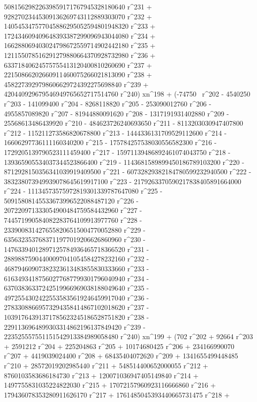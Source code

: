        50815629822639859171767945328180640 r^231 + 
       92827023445309136269743112889303070 r^232 + 
       140545347577045886295052594801948320 r^233 + 
       172434609409648393387299096943044080 r^234 + 
       166288069403024798672559714902442180 r^235 + 
       121155078516291279880664370928732980 r^236 + 
       63371840624575755413120400810260690 r^237 + 
       22150866202660911460075266021813090 r^238 + 
       4582273929798606629724392275698840 r^239 + 
       420440929679546949765652717514760 r^240) xn^198 + (-74750 \
r^202 - 4540250 r^203 - 141099400 r^204 - 8268118820 r^205 - 
       253090012760 r^206 - 4955857089820 r^207 - 
       81944880091620 r^208 - 1317191931402880 r^209 - 
       25568613486439920 r^210 - 484623726240693650 r^211 - 
       8113203030947407800 r^212 - 115211273586820678800 r^213 - 
       1444336131709529112600 r^214 - 16606297736111160340200 r^215 - 
       175784257538030556582300 r^216 - 
       1729205139790523111459400 r^217 - 
       15971139486892461074043750 r^218 - 
       139365905534037344523866400 r^219 - 
       1143681589899450186789103200 r^220 - 
       8712928150356341039919409500 r^221 - 
       60732829382184780599232940500 r^222 - 
       383238073949939078645619917100 r^223 - 
       2179263370590217838405891664000 r^224 - 
       11134573575972819301339787647080 r^225 - 
       50915808145533673996522088487120 r^226 - 
       207220971333054900484759584432960 r^227 - 
       744571990584082283764109913977760 r^228 - 
       2339008314276558206515004770052880 r^229 - 
       6356323537683711977019206626860960 r^230 - 
       14763394012897125784936465718366520 r^231 - 
       28898875904400097041054584278232160 r^232 - 
       46879460907382323613483855830333660 r^233 - 
       61634934187560277687799301796040940 r^234 - 
       63703836337242519966969038188049640 r^235 - 
       49725543024225535835619246459917040 r^236 - 
       27833088669573294358414867102018620 r^237 - 
       10391764391371785623245186528751820 r^238 - 
       2291136964899303314862196137849420 r^239 - 
       223525557551151542913384989058480 r^240) xn^199 + (702 r^202 + 
       92664 r^203 + 2591212 r^204 + 225204863 r^205 + 
       10174680425 r^206 + 234166990070 r^207 + 4419039024400 r^208 + 
       68435404072620 r^209 + 1341655499448485 r^210 + 
       28572019202985440 r^211 + 548514400652000055 r^212 + 
       8760103583686184730 r^213 + 120071036947405149840 r^214 + 
       1497755831035224822030 r^215 + 17072157960923116666860 r^216 + 
       179436078353280911626170 r^217 + 
       1761485045393440665731475 r^218 + 
